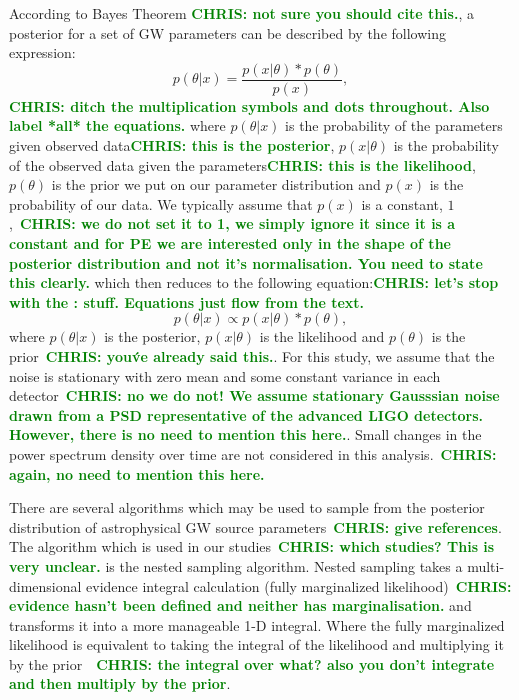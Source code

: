 \documentclass[%
showpacs,
 amsmath,amssymb,
 aps,
 twocolumn,
 prl,
 reprint,
floatfix,
]{revtex4-1}
\newcommand{\chris}[1]{\textbf{\textcolor{green}{CHRIS: #1}}}
\begin{document}
%
%
According to Bayes Theorem \cite{Bayestheorem}\chris{not sure you should cite
this.}, a posterior for a set of GW parameters can be described by the
following expression:
%
\begin{equation}
    p(\theta|x) = \frac{p(x|\theta) * p(\theta)}{p(x)},
\end{equation}
%
\chris{ditch the multiplication symbols and dots throughout. Also label *all*
the equations.} where $p(\theta|x)$ is the probability of the parameters given
observed data\chris{this is the posterior}, $p(x|\theta)$ is the probability of
the observed data given the parameters\chris{this is the likelihood},
$p(\theta)$ is the prior we put on our parameter distribution and $p(x)$ is the
probability of our data.  We typically assume that $p(x)$ is a constant,
$1$,~\chris{we do not set it to 1, we simply ignore it since it is a constant
and for PE we are interested only in the shape of the posterior distribution
and not it's normalisation. You need to state this clearly.} which then reduces
to the following equation:\chris{let's stop with the : stuff. Equations just
flow from the text.}
%
\begin{equation}
    p(\theta|x) \propto p(x|\theta) * p(\theta),
\end{equation}
%
where $p(\theta|x)$ is the posterior, $p(x|\theta)$ is the likelihood and
$p(\theta)$ is the prior~\chris{you\'ve already said this.}.  For this study,
we assume that the noise is stationary with zero mean and some constant
variance in each detector~\chris{no we do not! We assume stationary Gausssian
noise drawn from a PSD representative of the advanced LIGO detectors. However,
there is no need to mention this here.}. Small changes in the power spectrum
density over time are not considered in this analysis.~\chris{again, no need to
mention this here.} 

%
%
There are several algorithms which may be used to sample from the posterior
distribution of astrophysical GW source parameters~\chris{give references}. The
algorithm which is used in our studies~\chris{which studies? This is very
unclear.} is the nested sampling algorithm. Nested
sampling takes a multi-dimensional evidence integral calculation (fully
marginalized likelihood)~\chris{evidence hasn't been defined and neither has
marginalisation.} and transforms it into a more manageable 1-D integral.
Where the fully marginalized likelihood is equivalent to taking the integral of
the likelihood and multiplying it by the prior~\cite{1409.7215}~\chris{the
integral over what? also you don't integrate and then multiply by the prior}.
\end{document}
